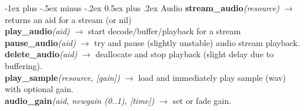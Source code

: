 \documentclass[10pt,landscape]{article}
\makeatletter
\renewcommand{\section}{\@startsection{section}{1}{0mm}%
                                {-1ex plus -.5ex minus -.2ex}%
                                {0.5ex plus .2ex}%
                                {\normalfont\large\bfseries}}
\makeatother
\begin{document}
\begin{multicols}{3}
\section{Audio}
	\textbf{stream\_audio}\emph{(resource)} $\rightarrow$ returns an aid for a stream (or nil)\\
	\textbf{play\_audio}\emph{(aid)} $\rightarrow$ start decode/buffer/playback for a stream\\
	\textbf{pause\_audio}\emph{(aid)} $\rightarrow$ try and pause (slightly unstable) audio stream playback.\\
	\textbf{delete\_audio}\emph{(aid)} $\rightarrow$ deallocate and stop playback (slight delay due to buffering).\\
	\textbf{play\_sample}\emph{(resource, [gain])} $\rightarrow$ load and immediately play sample (wav) with optional gain.\\
	\textbf{audio\_gain}\emph{(aid, newgain (0..1), [time])} $\rightarrow$ set or fade gain.\\


\end{multicols}
\end{document}
